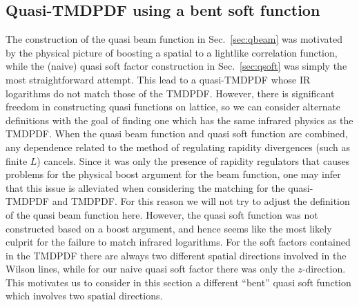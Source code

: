 \documentclass[11pt,a4paper]{article}
\DeclareRobustCommand{\sec}[1]{Sec.~\ref{sec:#1}}
\begin{document}
\subsection{Quasi-TMDPDF using a bent soft function}
\label{sec:qsoft_bent_nlo}

The construction of the quasi beam function in \sec{qbeam} was motivated by the physical picture of boosting a spatial to a lightlike correlation function, while the (naive) quasi soft factor construction in \sec{qsoft} was simply the most straightforward attempt.  This lead to a quasi-TMDPDF whose IR logarithms do not match those of the TMDPDF. 
However, there is significant freedom in constructing quasi functions on lattice, so we can consider alternate definitions with the goal of finding one which has the same infrared physics as the TMDPDF. 
When the quasi beam function and quasi soft function are combined, any dependence related to the method of regulating rapidity divergences (such as finite $L$) cancels. 
Since it was only the presence of rapidity regulators that causes problems for the physical boost argument for the beam function, one may infer that this issue is alleviated when considering the matching for the quasi-TMDPDF and TMDPDF. For this reason we will not try to adjust the definition of the quasi beam function here. 
However, the quasi soft function was not constructed based on a boost argument, and hence seems like the most likely culprit for the failure to match infrared logarithms. For the soft factors contained in the TMDPDF there are always two different spatial directions involved in the Wilson lines, while for our naive quasi soft factor there was only the $z$-direction. This motivates us to consider in this section a different ``bent'' quasi soft function which involves two spatial directions. 
\end{document}
